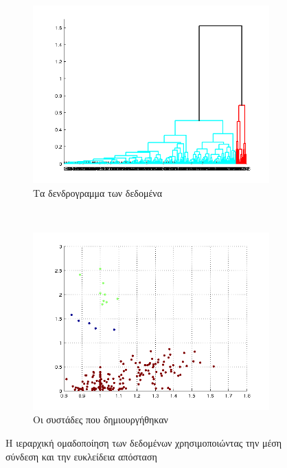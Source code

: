 \documentclass{assignment}
\begin{document}
\begin{figure}[htbp]
  \centering
  \begin{subfigure}[b]{0.5\textwidth}
     \includegraphics[width=\textwidth,height=0.25\textheight]{matlab/hierarchical_dendogram_average_euclidean.png}
  \caption{Τα δενδρογραμμα των δεδομένα}
  \end{subfigure}%
   ~ %
  \begin{subfigure}[b]{0.5\textwidth}
    \includegraphics[width=\textwidth,height=0.25\textheight]{matlab/identified_clusters_average_euclidean.png}
  \caption{Οι συστάδες που δημιουργήθηκαν}
  \end{subfigure}

  \caption{Η ιεραρχική ομαδοποίηση των δεδομένων χρησιμοποιώντας την μέση σύνδεση και την ευκλείδεια απόσταση}
\label{fig:clustering_average_euclidean}
\end{figure}
\end{document}
